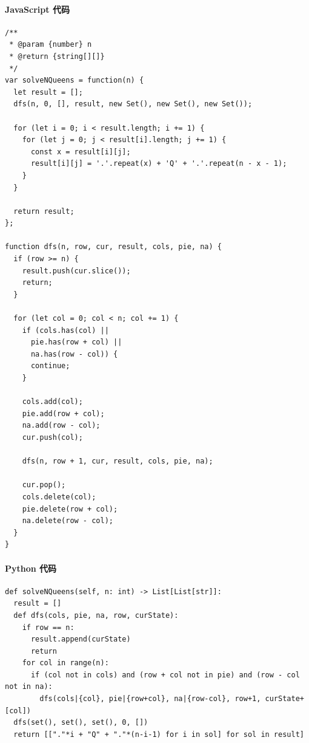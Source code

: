 \paragraph{JavaScript 代码}

\begin{verbatim}
/**
 * @param {number} n
 * @return {string[][]}
 */
var solveNQueens = function(n) {
  let result = [];
  dfs(n, 0, [], result, new Set(), new Set(), new Set());

  for (let i = 0; i < result.length; i += 1) {
    for (let j = 0; j < result[i].length; j += 1) {
      const x = result[i][j];
      result[i][j] = '.'.repeat(x) + 'Q' + '.'.repeat(n - x - 1);
    }
  }

  return result;
};

function dfs(n, row, cur, result, cols, pie, na) {
  if (row >= n) {
    result.push(cur.slice());
    return;
  }

  for (let col = 0; col < n; col += 1) {
    if (cols.has(col) ||
      pie.has(row + col) ||
      na.has(row - col)) {
      continue;
    }

    cols.add(col);
    pie.add(row + col);
    na.add(row - col);
    cur.push(col);

    dfs(n, row + 1, cur, result, cols, pie, na);

    cur.pop();
    cols.delete(col);
    pie.delete(row + col);
    na.delete(row - col);
  }
}
\end{verbatim}

\paragraph{Python 代码}

\begin{verbatim}
def solveNQueens(self, n: int) -> List[List[str]]:
  result = []
  def dfs(cols, pie, na, row, curState):
    if row == n:
      result.append(curState)
      return
    for col in range(n):
      if (col not in cols) and (row + col not in pie) and (row - col not in na):
        dfs(cols|{col}, pie|{row+col}, na|{row-col}, row+1, curState+[col])
  dfs(set(), set(), set(), 0, [])
  return [["."*i + "Q" + "."*(n-i-1) for i in sol] for sol in result]
\end{verbatim}
